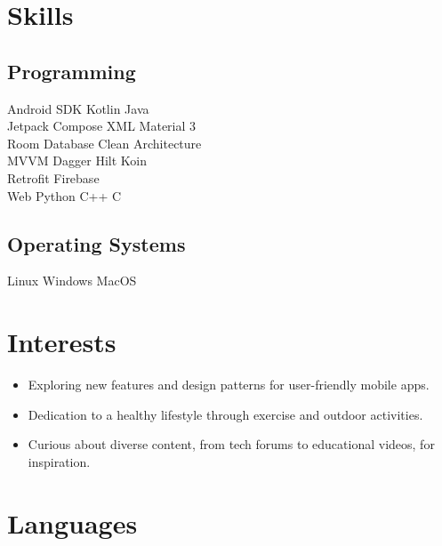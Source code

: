 \documentclass[bold]{deedy-resume-openfont}
\begin{document}
\begin{minipage}[t]{0.33\textwidth}

\section{Skills}
\subsection{Programming}
Android SDK \textbullet{} Kotlin \textbullet{} Java \\
Jetpack Compose \textbullet{} XML \textbullet{} Material 3  \\
Room Database \textbullet{} Clean Architecture \\ 
MVVM \textbullet{} Dagger Hilt \textbullet{} Koin \\ 
Retrofit \textbullet{} Firebase  \\
Web \textbullet{} Python \textbullet{} C++ \textbullet{} C \\
\vspace{\topsep} %
\subsection{Operating Systems}
Linux \textbullet{} Windows \textbullet{} MacOS
\sectionsep


\section*{Interests}
\begin{itemize}[leftmargin=0pt]
    \item {} Exploring new features and design patterns for user-friendly mobile apps.
    \item {} Dedication to a healthy lifestyle through exercise and outdoor activities.
    \item {} Curious about diverse content, from tech forums to educational videos, for inspiration.
\end{itemize}


\section{Languages}

\end{minipage}
\end{document}
